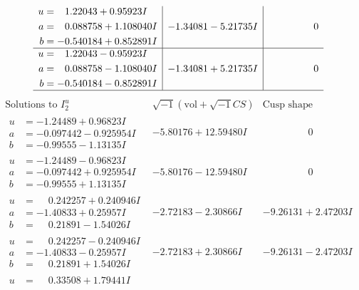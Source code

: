 \documentclass[1p]{elsarticle_modified}
\theoremstyle{definition}
\newcommand{\I}{\sqrt{-1}}
\begin{document}
$$\begin{array}{c|c|c}
\begin{aligned}
u &= \phantom{-}1.22043 + 0.95923 I \\
a &= \phantom{-}0.088758 + 1.108040 I \\
b &= -0.540184 + 0.852891 I\end{aligned}
 & -1.34081 - 5.21735 I & \phantom{-0.000000 } 0 \\ \hline\begin{aligned}
u &= \phantom{-}1.22043 - 0.95923 I \\
a &= \phantom{-}0.088758 - 1.108040 I \\
b &= -0.540184 - 0.852891 I\end{aligned}
 & -1.34081 + 5.21735 I & \phantom{-0.000000 } 0\\
 \hline 
 \end{array}$$\newpage$$\begin{array}{c|c|c}  
\text{Solutions to }I^u_{2}& \I (\text{vol} + \sqrt{-1}CS) & \text{Cusp shape}\\
 \hline 
\begin{aligned}
u &= -1.24489 + 0.96823 I \\
a &= -0.097442 - 0.925954 I \\
b &= -0.99555 - 1.13135 I\end{aligned}
 & -5.80176 + 12.59480 I & \phantom{-0.000000 } 0 \\ \hline\begin{aligned}
u &= -1.24489 - 0.96823 I \\
a &= -0.097442 + 0.925954 I \\
b &= -0.99555 + 1.13135 I\end{aligned}
 & -5.80176 - 12.59480 I & \phantom{-0.000000 } 0 \\ \hline\begin{aligned}
u &= \phantom{-}0.242257 + 0.240946 I \\
a &= -1.40833 + 0.25957 I \\
b &= \phantom{-}0.21891 - 1.54026 I\end{aligned}
 & -2.72183 - 2.30866 I & -9.26131 + 2.47203 I \\ \hline\begin{aligned}
u &= \phantom{-}0.242257 - 0.240946 I \\
a &= -1.40833 - 0.25957 I \\
b &= \phantom{-}0.21891 + 1.54026 I\end{aligned}
 & -2.72183 + 2.30866 I & -9.26131 - 2.47203 I \\ \hline\begin{aligned}
u &= \phantom{-}0.33508 + 1.79441 I \\

\end{aligned}
\end{array}$$
\end{document}

